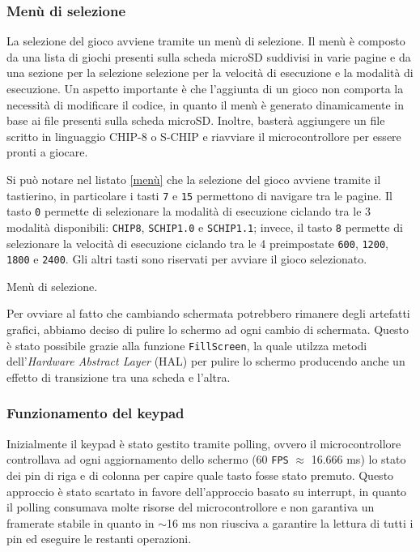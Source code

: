 \documentclass[a4paper]{article}
\begin{document}
\subsubsection{Menù di selezione}

La selezione del gioco avviene tramite un menù di selezione. Il menù è composto da una lista di giochi presenti sulla scheda microSD suddivisi in varie pagine e da una sezione per la selezione selezione per la velocità di esecuzione e la modalità di esecuzione. Un aspetto importante è che l'aggiunta di un gioco non comporta la necessità di modificare il codice, in quanto il menù è generato dinamicamente in base ai file presenti sulla scheda microSD. Inoltre, basterà aggiungere un file scritto in linguaggio CHIP-8 o S-CHIP e riavviare il microcontrollore per essere pronti a giocare.

Si può notare nel listato \ref{menù} che la selezione del gioco avviene tramite il tastierino, in particolare i tasti \texttt{7} e \texttt{15} permettono di navigare tra le pagine. Il tasto \texttt{0} permette di selezionare la modalità di esecuzione ciclando tra le 3 modalità disponibili: \texttt{CHIP8}, \texttt{SCHIP1.0} e \texttt{SCHIP1.1}; invece, il tasto \texttt{8} permette di selezionare la velocità di esecuzione ciclando tra le 4 preimpostate \texttt{600}, \texttt{1200}, \texttt{1800} e \texttt{2400}. Gli altri tasti sono riservati per avviare il gioco selezionato.

\begin{Listing}[h!t] %
    \centering
    \caption{Menù di selezione.}
    \label{menù}
\end{Listing}

Per ovviare al fatto che cambiando schermata potrebbero rimanere degli artefatti grafici, abbiamo deciso di pulire lo schermo ad ogni cambio di schermata. Questo è stato possibile grazie alla funzione \texttt{FillScreen}, la quale utilzza metodi dell'\textit{Hardware Abstract Layer} (HAL) per pulire lo schermo producendo anche un effetto di transizione tra una scheda e l'altra.

\subsubsection{Funzionamento del keypad}\label{subsubsec:keypad}

Inizialmente il keypad è stato gestito tramite polling, ovvero il microcontrollore controllava ad ogni aggiornamento dello schermo (60 \texttt{FPS} $\approx$ 16.666 ms) lo stato dei pin di riga e di colonna per capire quale tasto fosse stato premuto. Questo approccio è stato scartato in favore dell'approccio basato su interrupt, in quanto il polling consumava molte risorse del microcontrollore e non garantiva un framerate stabile in quanto in $\sim$16 ms non riusciva a garantire la lettura di tutti i pin ed eseguire le restanti operazioni.
\end{document}
